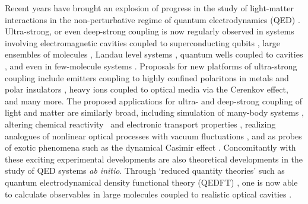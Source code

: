 \documentclass[aps,prl,twocolumn,
	groupedaddress,superscriptaddress,
	amsfonts,amssymb,amsmath,floatfix,
	citeautoscript]{revtex4-1}
\begin{document}
 Recent years have brought an explosion of progress in the study of light-matter interactions in the non-perturbative regime of quantum electrodynamics (QED) \cite{flick7strong,ruggenthaler2017b,forn2018ultrastrong,kockum2018ultrastrong}. Ultra-strong, or even deep-strong coupling is now regularly observed in systems involving electromagnetic cavities coupled to superconducting qubits \cite{blais2004,wallraff2004,yoshihara2017superconducting,forn2017ultrastrong}, large ensembles of molecules \cite{hutchison2012,hutchison2013,coles2014,coles2014b,shalabney2015coherent, thomas2016,ebbesen2016}, Landau level systems \cite{hagenmuller2010ultrastrong,scalari2012ultrastrong,zhang2016collective},  quantum wells coupled to cavities \cite{todorov2010ultrastrong,geiser2012ultrastrong}, and even in few-molecule systems \cite{benz2016,chikkaraddy2016}. Proposals for new platforms of ultra-strong coupling include emitters coupling to highly confined polaritons in metals and polar insulators \cite{rivera2016shrinking}, heavy ions coupled to optical media via the Cerenkov effect, and many more. The proposed applications for ultra- and deep-strong coupling of light and matter are similarly broad, including simulation of many-body systems \cite{forn2018ultrastrong}, altering chemical reactivity~\cite{hutchison2012, thomas2016,flick2017} and electronic transport properties \cite{orgiu2015}, realizing analogues of nonlinear optical processes with vacuum fluctuations \cite{kockum2017deterministic}, and as probes of exotic phenomena such as the dynamical Casimir effect \cite{ciuti2005quantum}. Concomitantly with these exciting experimental developments are also theoretical developments in the study of QED systems \textit{ab initio}. Through `reduced quantity theories' such as quantum electrodynamical density functional theory (QEDFT) \cite{ruggenthaler2014,pellegrini2015,flick2015,dimitrov2017,flick2018,flick2018b,schaefer2018}, one is now able to calculate observables in large molecules coupled to realistic optical cavities  \cite{flick2017c}. 
\end{document}
